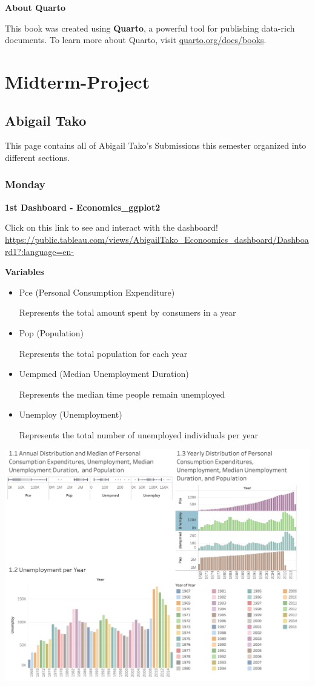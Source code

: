\documentclass[
  letterpaper,
  DIV=11,
  numbers=noendperiod]{scrreprt}
\begin{document}
\textbf{About Quarto}

This book was created using \textbf{Quarto}, a powerful tool for
publishing data-rich documents. To learn more about Quarto, visit
\href{https://quarto.org/docs/books}{quarto.org/docs/books}.

\part{Midterm-Project}

\chapter{Abigail Tako}\label{abigail-tako}

This page contains all of Abigail Tako's Submissions this semester
organized into different sections.

\section{Monday}\label{monday}

\textbf{1st Dashboard - Economics\_ggplot2}

Click on this link to see and interact with the dashboard!
\url{https://public.tableau.com/views/AbigailTako_Econoomics_dashboard/Dashboard1?:language=en-}

\textbf{Variables}

\begin{itemize}
\item
  Pce (Personal Consumption Expenditure)

  Represents the total amount spent by consumers in a year
\item
  Pop (Population)

  Represents the total population for each year
\item
  Uempmed (Median Unemployment Duration)

  Represents the median time people remain unemployed
\item
  Unemploy (Unemployment)

  Represents the total number of unemployed individuals per year
\end{itemize}

\includegraphics{./dashboard-economics.png}
\end{document}

